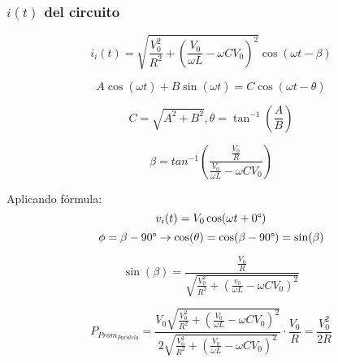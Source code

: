   \subsubsection*{$i(t)$ del circuito}

  \begin{equation*}
    i_i(t) = \sqrt{\frac{V_0^2}{R^2} + \left(\frac{V_0}{\omega L} - \omega CV_0\right)^2} \cos(\omega t - \beta)
  \end{equation*}

  \begin{equation*}
    A \cos(\omega t) + B \sin(\omega t) = C \cos(\omega t - \theta)
  \end{equation*}

  \begin{equation*}
    C = \sqrt{A^2 + B^2}, \theta = \tan^{-1}\left(\frac{A}{B} \right)
  \end{equation*}

  \begin{equation*}
    \beta = tan^{-1}\left(\frac{\frac{V_0}{R}}{\frac{V_0}{\omega L} - \omega C V_0}\right)
  \end{equation*}

  \begin{center}
  \end{center}

  Aplicando fórmula:
  \begin{equation*}
    v_i(t) = V_0\cos(\omega t + 0 \degree)
  \end{equation*}
  \begin{equation*}
    \phi = \beta - 90 \degree \to \cos(\theta) = \cos(\beta - 90 \degree) = \sin(\beta)
  \end{equation*}

  \begin{equation*}
    \sin(\beta) = \frac{\frac{V_0}{R}}{\sqrt{\frac{V_0^2}{R^2} + \left(\frac{v_0}{\omega L} - \omega C V_0 \right)^2}}
  \end{equation*}

  \begin{equation}
    P_{Prom_{Paralelo}} = \frac{V_0 \sqrt{\frac{V_0^2}{R^2} + \left(\frac{V_0}{\omega L} - \omega C V_0 \right)^2}}{2 \sqrt{\frac{V_0^2}{R^2} + \left(\frac{V_0}{\omega L} - \omega C V_0 \right)^2}} \cdot \frac{V_0}{R} = \frac{V_0^2}{2R} \label{pot_prom_paral}
  \end{equation}
